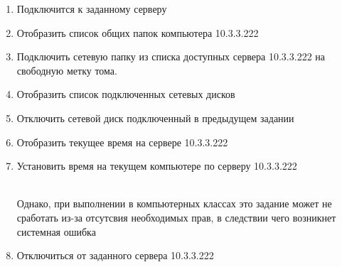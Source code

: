 \documentclass[a4paper,12pt]{article}
\begin{document}
\begin{flushleft}
\begin{enumerate} [1. ]
\begin{enumerate} [\bf a. ]
\begin{flushleft}
         \\
         или\\
        \end{flushleft}
        \item Подключится к заданному серверу 
        \begin{flushleft}
        \end{flushleft}
        \item Отобразить список общих папок компьютера 10.3.3.222
        \begin{flushleft}
        \end{flushleft}
        \item Подключить сетевую папку из списка доступных сервера 10.3.3.222 на свободную метку тома.
        \begin{flushleft}
        \end{flushleft}
        \item Отобразить список подключенных сетевых дисков
        \begin{flushleft}
        \end{flushleft}
        \item Отключить сетевой диск подключенный в предыдущем задании
        \begin{flushleft}
        \end{flushleft}
        \item Отобразить текущее время на сервере 10.3.3.222
        \begin{flushleft}
        \end{flushleft}
        \item Установить время на текущем компьютере по серверу 10.3.3.222
        \begin{flushleft}
          \\
         Однако, при выполнении в компьютерных классах это задание может не сработать из-за отсутсвия необходимых прав, в следствии чего возникнет системная ошибка
        \end{flushleft}
        \item Отключиться от заданного сервера 10.3.3.222

\end{enumerate}
\end{enumerate}
\end{flushleft}
\end{document}
